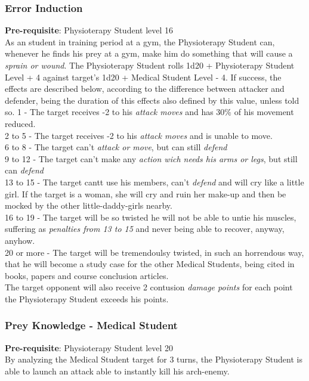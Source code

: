 \documentclass[ letterpaper,12pt]{article}
\begin{document}
\subsubsection{Error Induction}
 {\bf Pre-requisite}: Physioterapy Student level 16\\
 As an student in training period at a gym, the Physioterapy Student can, whenever he finds his prey at a gym, make him do something that will cause a {\it sprain or wound}. The Physioterapy Student rolls 1d20 + Physioterapy Student Level + 4 against target's 1d20 + Medical Student Level - 4. If success, the effects are described below, according to the difference between attacker and defender, being the duration of this effects also defined by this value, unless told so.
1 - The target receives -2 to his {\it attack moves} and has 30\% of his {movement} reduced.\\
2 to 5 - The target receives -2 to his {\it attack moves} and is unable to move.\\
6 to 8 - The target can't {\it attack or move}, but can still {\it defend}\\
9 to 12 - The target can't make any {\it action wich needs his arms or legs}, but still can {\it defend}\\
13 to 15 - The target cantt use his members, can't {\it defend} and will cry like a little girl. If the target is a woman, she will cry and ruin her make-up and then be mocked by the other little-daddy-girls nearby.\\
16 to 19 - The target will be so twisted he will not be able to untie his muscles, suffering as {\it penalties from 13 to 15} and never being able to recover, anyway, anyhow.\\
20 or more - The target will be tremendoulsy twisted, in such an horrendous way, that he will become a study case for the other Medical Students, being cited in books, papers and course conclusion articles. \\

The target opponent will also receive 2 contusion {\it damage points} for each point the Physioterapy Student exceeds his points.

\subsubsection{Prey Knowledge - Medical Student}
 {\bf Pre-requisite}: Physioterapy Student level 20\\
 By analyzing the Medical Student target for 3 turns, the Physioterapy Student is able to launch an attack able to instantly kill his arch-enemy.
\end{document}
